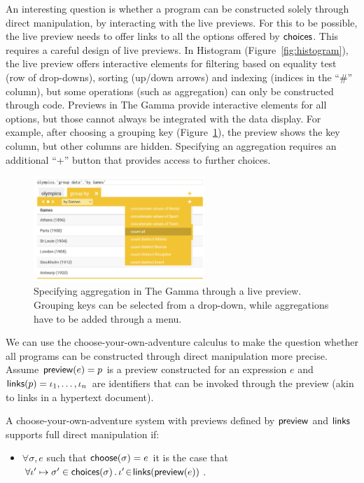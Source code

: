 \documentclass[anonymous, a4paper,UKenglish,cleveref, autoref, thm-restate]{lipics-v2021}
\newcommand{\ident}[1]{\textsf{#1}}
\newcommand{\select}{\textnormal{\ident{choose}}}
\newcommand{\choices}{\textnormal{\ident{choices}}}
\newcommand{\preview}{\textnormal{\ident{preview}}}
\newcommand{\links}{\textnormal{\ident{links}}}
\begin{document}
An interesting question is whether a program can be constructed solely through direct manipulation,
by interacting with the live previews. For this to be possible, the live preview needs to
offer links to all the options offered by $\choices$. This requires a careful design
of live previews. In Histogram (Figure~\ref{fig:histogram}), the live preview offers interactive
elements for filtering based on equality test (row of drop-downs), sorting (up/down arrows)
and indexing (indices in the ``\#'' column), but some operations (such as aggregation) can only
be constructed through code. Previews in The Gamma provide interactive elements for all options,
but those cannot always be integrated with the data display. For example, after choosing a grouping
key (Figure~\ref{fig:groupby}), the preview shows the key column, but other columns are hidden.
Specifying an aggregation requires an additional ``+'' button that provides access to further choices.

\begin{figure}[t]
\vspace{-1em}
\includegraphics[width=0.575\textwidth]{fig/thegamma3.png}
\caption{Specifying aggregation in The Gamma through a live preview. Grouping keys can be
  selected from a drop-down, while aggregations have to be added through a menu.}
\label{fig:groupby}
\end{figure}

We can use the choose-your-own-adventure calculus to make the question whether all
programs can be constructed through direct manipulation more precise. Assume
$\preview(e)=p$ is a preview constructed for an expression $e$ and $\links(p)=\iota_1, \ldots, \iota_n$
are identifiers that can be invoked through the preview (akin to links in a hypertext document).

\begin{definition}
A choose-your-own-adventure system with previews defined by $\preview$ and $\links$ supports
full direct manipulation if:
\begin{itemize}
\item $\forall \sigma, e$ such that $\select(\sigma)=e$ it is the case that
  $\forall \iota'\mapsto\sigma'\in\choices(\sigma)\,.\,\iota'\!\in\!\links(\preview(e))$.
\end{itemize}
\end{definition}
\end{document}
